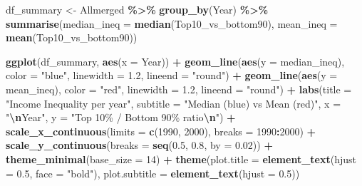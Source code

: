 \documentclass[
]{article}
\newenvironment{Shaded}{\begin{snugshade}}{\end{snugshade}}
\newcommand{\AttributeTok}[1]{\textcolor[rgb]{0.13,0.29,0.53}{#1}}
\newcommand{\DecValTok}[1]{\textcolor[rgb]{0.00,0.00,0.81}{#1}}
\newcommand{\FloatTok}[1]{\textcolor[rgb]{0.00,0.00,0.81}{#1}}
\newcommand{\FunctionTok}[1]{\textcolor[rgb]{0.13,0.29,0.53}{\textbf{#1}}}
\newcommand{\NormalTok}[1]{#1}
\newcommand{\OtherTok}[1]{\textcolor[rgb]{0.56,0.35,0.01}{#1}}
\newcommand{\SpecialCharTok}[1]{\textcolor[rgb]{0.81,0.36,0.00}{\textbf{#1}}}
\newcommand{\StringTok}[1]{\textcolor[rgb]{0.31,0.60,0.02}{#1}}
\begin{document}
\begin{Shaded}
\begin{Highlighting}[]
\NormalTok{df\_summary }\OtherTok{\textless{}{-}}\NormalTok{ Allmerged }\SpecialCharTok{\%\textgreater{}\%}
  \FunctionTok{group\_by}\NormalTok{(Year) }\SpecialCharTok{\%\textgreater{}\%}
  \FunctionTok{summarise}\NormalTok{(}\AttributeTok{median\_ineq =} \FunctionTok{median}\NormalTok{(Top10\_vs\_bottom90),}
            \AttributeTok{mean\_ineq =} \FunctionTok{mean}\NormalTok{(Top10\_vs\_bottom90))}

\FunctionTok{ggplot}\NormalTok{(df\_summary, }\FunctionTok{aes}\NormalTok{(}\AttributeTok{x =}\NormalTok{ Year)) }\SpecialCharTok{+}
  \FunctionTok{geom\_line}\NormalTok{(}\FunctionTok{aes}\NormalTok{(}\AttributeTok{y =}\NormalTok{ median\_ineq), }\AttributeTok{color =} \StringTok{"blue"}\NormalTok{, }
            \AttributeTok{linewidth =} \FloatTok{1.2}\NormalTok{, }
            \AttributeTok{lineend =} \StringTok{"round"}\NormalTok{) }\SpecialCharTok{+}
  \FunctionTok{geom\_line}\NormalTok{(}\FunctionTok{aes}\NormalTok{(}\AttributeTok{y =}\NormalTok{ mean\_ineq), }
            \AttributeTok{color =} \StringTok{"red"}\NormalTok{,}
            \AttributeTok{linewidth =} \FloatTok{1.2}\NormalTok{,}
            \AttributeTok{lineend =} \StringTok{"round"}\NormalTok{) }\SpecialCharTok{+}
  \FunctionTok{labs}\NormalTok{(}\AttributeTok{title =} \StringTok{"Income Inequality per year"}\NormalTok{, }
       \AttributeTok{subtitle =} \StringTok{"Median (blue) vs Mean (red)"}\NormalTok{,}
       \AttributeTok{x =} \StringTok{"}\SpecialCharTok{\textbackslash{}n}\StringTok{Year"}\NormalTok{, }
       \AttributeTok{y =} \StringTok{"Top 10\% / Bottom 90\% ratio}\SpecialCharTok{\textbackslash{}n}\StringTok{"}\NormalTok{) }\SpecialCharTok{+}
  \FunctionTok{scale\_x\_continuous}\NormalTok{(}\AttributeTok{limits =} \FunctionTok{c}\NormalTok{(}\DecValTok{1990}\NormalTok{, }\DecValTok{2000}\NormalTok{), }\AttributeTok{breaks =} \DecValTok{1990}\SpecialCharTok{:}\DecValTok{2000}\NormalTok{) }\SpecialCharTok{+}
  \FunctionTok{scale\_y\_continuous}\NormalTok{(}\AttributeTok{breaks =} \FunctionTok{seq}\NormalTok{(}\FloatTok{0.5}\NormalTok{, }\FloatTok{0.8}\NormalTok{, }\AttributeTok{by =} \FloatTok{0.02}\NormalTok{)) }\SpecialCharTok{+}
  \FunctionTok{theme\_minimal}\NormalTok{(}\AttributeTok{base\_size =} \DecValTok{14}\NormalTok{) }\SpecialCharTok{+}
  \FunctionTok{theme}\NormalTok{(}\AttributeTok{plot.title =} \FunctionTok{element\_text}\NormalTok{(}\AttributeTok{hjust =} \FloatTok{0.5}\NormalTok{, }\AttributeTok{face =} \StringTok{"bold"}\NormalTok{),}
    \AttributeTok{plot.subtitle =} \FunctionTok{element\_text}\NormalTok{(}\AttributeTok{hjust =} \FloatTok{0.5}\NormalTok{))}
\end{Highlighting}
\end{Shaded}
\end{document}
